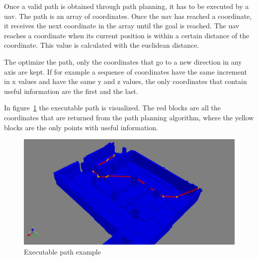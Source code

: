 Once a valid path is obtained through path planning, it has to be executed by a \acs{uav}. The path is an array of coordinates. Once the \acs{uav} has reached a coordinate, it receives the next coordinate in the array until the goal is reached. The \acs{uav} reaches a coordinate when its current position is within a certain distance of the coordinate. This value is calculated with the euclidean distance.

The optimize the path, only the coordinates that go to a new direction in any axis are kept. If for example a sequence of coordinates have the same increment in x values and have the same y and z values, the only coordinates that contain useful information are the first and the last.

In figure~\ref{fig:path} the executable path is visualized. The red blocks are all the coordinates that are returned from the path planning algorithm, where the yellow blocks are the only points with useful information.

\begin{figure}[!h]
  \centering
  \includegraphics[width=\linewidth]{images/path.png}
  \caption{Executable path example}
  \label{fig:path}
\end{figure}
